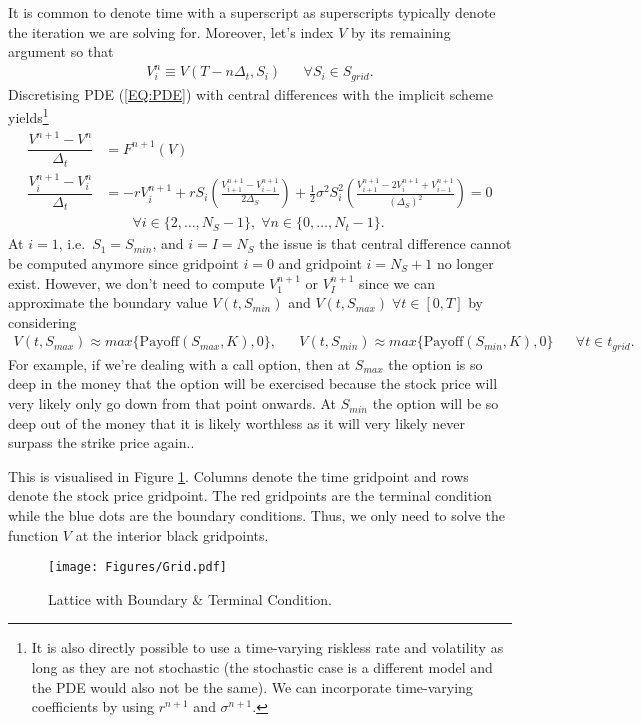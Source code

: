 \documentclass[11pt,a4paper]{article}
\begin{document}
It is common to denote time with a superscript as superscripts typically denote the iteration we are solving for. Moreover, let's index $V$ by its remaining argument so that 
\begin{align*}
V^n_{i} \equiv V(T-n\Delta_t,S_i) && \forall S_i \in S_{grid}.
\end{align*}
Discretising PDE (\ref{EQ:PDE}) with central differences with the implicit scheme yields\footnote{It is also directly possible to use a time-varying riskless rate and volatility as long as they are not stochastic (the stochastic case is a different model and the PDE would also not be the same). We can incorporate time-varying coefficients by using $r^{n+1}$ and $\sigma^{n+1}$.}
\begin{align*}
\dfrac{V^{n+1}-V^n}{\Delta_t} & = F^{n+1}(V) \\
\dfrac{V^{n+1}_{i}-V^n_{i}}{\Delta_t} & =  
- rV_i^{n+1} 
+ rS_i \left( \frac{V_{i+1}^{n+1} - V_{i-1}^{n+1}}{2 \Delta_S} \right) 
+ \frac{1}{2} \sigma^2 S_i^2 \left( \frac{V_{i+1}^{n+1} - 2V_i^{n+1} + V_{i-1}^{n+1}}{(\Delta_S)^2} \right) 
= 0 \\
& \qquad \forall i \in\{2,\ldots, N_S-1\}, \; \forall n \in \{0,\ldots, N_t-1\}.
\end{align*}
At $i=1$, i.e.\ $S_1 = S_{min}$, and $i=I=N_S$ the issue is that central difference cannot be computed anymore since gridpoint $i=0$ and gridpoint $i=N_S+1$ no longer exist. However, we don't need to compute $V^{n+1}_{1}$ or $V^{n+1}_{I}$ since we can approximate the boundary value $V(t,S_{min})$ and $V(t,S_{max}) \; \forall t \in [0,T]$ by considering 
\begin{align*}
V(t,S_{max}) \approx max\{\text{Payoff}(S_{max},K), 0\}, && V(t,S_{min}) \approx max\{\text{Payoff}(S_{min},K), 0\} && \forall t \in t_{grid}.
\end{align*}
For example, if we're dealing with a call option, then at $S_{max}$ the option is so deep in the money that the option will be exercised because the stock price will  very likely only go down from that point onwards. At $S_{min}$ the option will be so deep out of the money that it is likely worthless as it will very likely never surpass the strike price again..

This is visualised in Figure \ref{Fig:Grid}. Columns denote the time gridpoint and rows denote the stock price gridpoint. The red gridpoints are the terminal condition while the blue dots are the boundary conditions. Thus, we only need to solve the function $V$ at the interior black gridpoints.
\begin{figure}[htpb]
\caption{Lattice with Boundary \& Terminal Condition.} 
\centering
\texttt{[image: Figures/Grid.pdf]} \label{Fig:Grid}
\end{figure}
\end{document}
